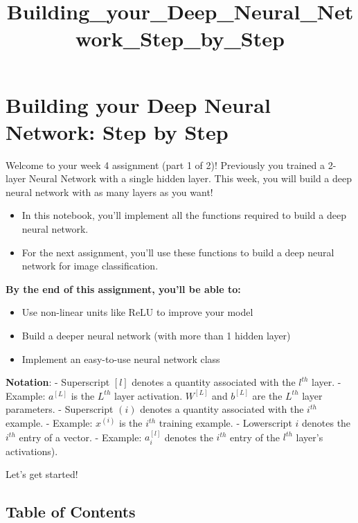 \documentclass[11pt]{article}
\title{Building\_your\_Deep\_Neural\_Network\_Step\_by\_Step}
\providecommand{\tightlist}{%
      \setlength{\itemsep}{0pt}\setlength{\parskip}{0pt}}
\begin{document}
    
    \maketitle
    
    

    
    \hypertarget{building-your-deep-neural-network-step-by-step}{%
\section{Building your Deep Neural Network: Step by
Step}\label{building-your-deep-neural-network-step-by-step}}

Welcome to your week 4 assignment (part 1 of 2)! Previously you trained
a 2-layer Neural Network with a single hidden layer. This week, you will
build a deep neural network with as many layers as you want!

\begin{itemize}
\tightlist
\item
  In this notebook, you'll implement all the functions required to build
  a deep neural network.
\item
  For the next assignment, you'll use these functions to build a deep
  neural network for image classification.
\end{itemize}

\textbf{By the end of this assignment, you'll be able to:}

\begin{itemize}
\tightlist
\item
  Use non-linear units like ReLU to improve your model
\item
  Build a deeper neural network (with more than 1 hidden layer)
\item
  Implement an easy-to-use neural network class
\end{itemize}

\textbf{Notation}: - Superscript \([l]\) denotes a quantity associated
with the \(l^{th}\) layer. - Example: \(a^{[L]}\) is the \(L^{th}\)
layer activation. \(W^{[L]}\) and \(b^{[L]}\) are the \(L^{th}\) layer
parameters. - Superscript \((i)\) denotes a quantity associated with the
\(i^{th}\) example. - Example: \(x^{(i)}\) is the \(i^{th}\) training
example. - Lowerscript \(i\) denotes the \(i^{th}\) entry of a vector. -
Example: \(a^{[l]}_i\) denotes the \(i^{th}\) entry of the \(l^{th}\)
layer's activations).

Let's get started!

    \hypertarget{table-of-contents}{%
\subsection{Table of Contents}\label{table-of-contents}}
\end{document}
